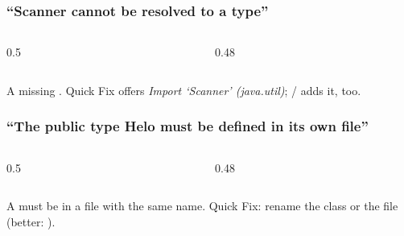 \documentclass[aspectratio=169,10pt,compress]{beamer}
\begin{document}
\begin{frame}[t,fragile] \frametitle{``Scanner cannot be resolved to a type''}
  \begin{columns}[T]
    \begin{column}{0.5\textwidth}
    \end{column}
    \begin{column}{0.48\textwidth}
    \end{column}
  \end{columns}

  \vspace{0.2em}
  \small A missing . Quick Fix offers \emph{Import `Scanner' (java.util)};  /  adds it, too.
\end{frame}




\begin{frame}[t,fragile] \frametitle{``The public type Helo must be defined in its own file''}
  \begin{columns}[T]
    \begin{column}{0.5\textwidth}
    \end{column}
    \begin{column}{0.48\textwidth}
    \end{column}
  \end{columns}

  \vspace{0.2em}
  \small A  must be in a file with the same name. Quick Fix: rename the class or the file
  (better: ).
\end{frame}
\end{document}
